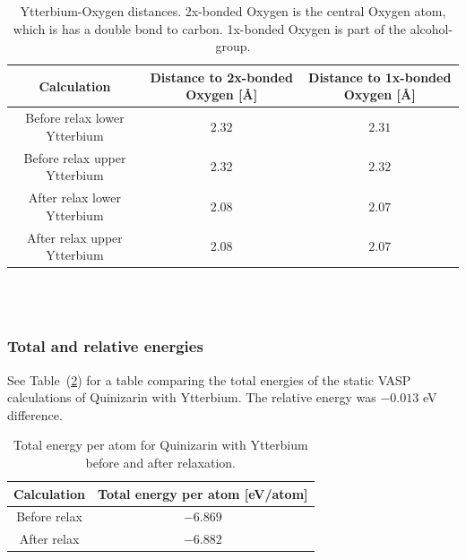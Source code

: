 \documentclass{article}
\begin{document}
      \begin{table}[H]
        \centering
        \caption{Ytterbium-Oxygen distances. 2x-bonded Oxygen is the central Oxygen atom, which is has a double bond to carbon. 1x-bonded Oxygen is part of the alcohol-group. }
        \label{tab:neighborYb}
        \begin{tabular}{|c|c|c|}
            \hline
            Calculation & Distance to 2x-bonded Oxygen [Å] & Distance to 1x-bonded Oxygen [Å]  \\
            \hline \hline
            Before relax lower Ytterbium & $2.32$ & $2.31$ \\
            Before relax upper Ytterbium & $2.32$ & $2.32$ \\
            After relax lower Ytterbium & $2.08$ & $2.07$ \\
            After relax upper Ytterbium & $2.08$ & $2.07$ \\
            \hline
        \end{tabular} \\
        \hspace{0pt}\\
      \end{table}


      \vspace{1cm}

    \subsubsection{Total and relative energies}

      See Table~(\ref{tab:TOTENYb}) for a table comparing the total energies of the static VASP calculations of Quinizarin with Ytterbium. The relative energy was $-0.013$ eV difference. \\

      \begin{table}[H]
        \centering
        \caption{Total energy per atom for Quinizarin with Ytterbium before and after relaxation. }
        \label{tab:TOTENYb}
        \begin{tabular}{|c|c|}
            \hline
            Calculation & Total energy per atom [eV/atom]  \\
            \hline \hline
            Before relax & $-6.869$ \\
            After relax & $-6.882$ \\
            \hline
        \end{tabular} \\
        \hspace{0pt}\\
      \end{table}
\end{document}
